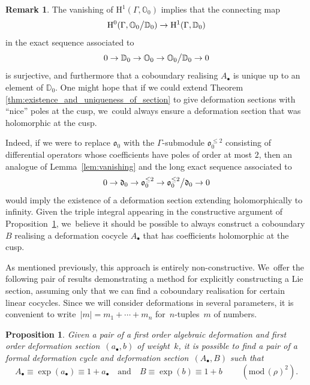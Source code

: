 \documentclass[JEP,XML,SOM,Unicode,published]{cedram}
\let\oldbullet\bullet
\renewcommand{\bullet}{{\scriptscriptstyle\oldbullet}}
\theoremstyle{plain}
\newtheorem{proposition}[theoremcounter]{Proposition}
\theoremstyle{definition}
\newtheorem{remark}[theoremcounter]{Remark}
\newcommand{\tx}{\text}
\newcommand{\nbd}{\nobreakdash-\hspace{0pt}}
\newcommand{\bbD}{\ensuremath{\mathbb{D}}}
\newcommand{\bbO}{\ensuremath{\mathbb{O}}}
\newcommand{\frakd}{\ensuremath{\mathfrak{d}}}
\newcommand{\frako}{\ensuremath{\mathfrak{o}}}
\newcommand{\rmH}{\ensuremath{\mathrm{H}}}
\renewcommand{\pmod}[1]{\;(\mathrm{mod}\, #1)}
\let\Ga\Gamma
\begin{document}
\begin{remark}\label{rem:uniqueness}
The vanishing of $\rmH^1(\Ga,\bbO_0)$ implies that the connecting map
\begin{equation*}
\rmH^0(\Ga,\bbO_0\big\slash \bbD_0) \to \rmH^1(\Ga,\bbD_0)
\end{equation*}
in the exact sequence associated to
\[
0 \to \bbD_0 \to \bbO_0 \to \bbO_0\big\slash\bbD_0 \to 0\]
is surjective, and furthermore that a coboundary realising $A_\bullet$ is unique up to an element of $\bbD_0$. One might hope that if we could extend Theorem \ref{thm:existence_and_uniqueness_of_section} to give deformation sections with ``nice'' poles at the cusp, we~could always ensure a deformation section that was holomorphic at the cusp.

Indeed, if we were to replace $\frako_0$ with the $\Ga$\nbd{}submodule $\frako_0^{\leq 2}$ consisting of differential operators whose coefficients have poles of order at most $2$, then an analogue of Lemma~\ref{lem:vanishing} and the long exact sequence associated to
\[
0 \to \frakd_0 \to \frako_0^{\leq 2} \to \frako_0^{\leq 2}\big\slash \frakd_0 \to 0\]
would imply the existence of a deformation section extending holomorphically to infinity. Given the triple integral appearing in the constructive argument of Proposition~\ref{prop:extending_sections}, we~believe it should be possible to always construct a coboundary $B$ realising a deformation cocycle $A_\bullet$ that has coefficients holomorphic at the cusp.
\end{remark}

As mentioned previously, this approach is entirely non-constructive. We~offer the following pair of results demonstrating a method for explicitly constructing a Lie section, assuming only that we can find a coboundary realisation for certain linear cocycles. Since we will consider deformations in several parameters, it is convenient to write~$|m| = m_1 + \cdots + m_n$ for~$n$\nbd{}tuples~$m$ of numbers.

\begin{proposition}
\label{prop:extending_sections}
Given a pair of a \emph{first order} algebraic deformation and first order deformation section~$(a_\bullet,b)$ of weight~$k$, it is possible to find a pair of a \emph{formal} deformation cycle and deformation section~$(A_\bullet,B)$ such that
\begin{equation*}
A_\bullet \equiv \exp(a_\bullet) \equiv 1 + a_\bullet
\quad\text{and}\quad
B \equiv \exp(b) \equiv 1 + b
\qquad\pmod{(\rho)^2}
\tx{.}
\end{equation*}
\end{proposition}
\end{document}
